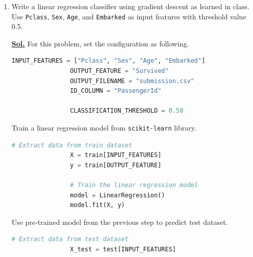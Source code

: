 \documentclass[12pt, a4paper]{article}
\newcommand{\sol}{\par\noindent\underline{\textbf{Sol.}} }
\newcommand{\ans}{\par\noindent\underline{\textbf{Ans.}} }
\begin{document}
\begin{enumerate}
\begin{itemize}
\begin{lstlisting}[language=Python, caption=Repeat the process on the \texttt{Sex} column., gobble=20]
                    # Calculate mode value of the Sex column.
                    mode_sex = train["Sex"].mode()[0]
                    print(f"The mode of sex is {mode_sex}.")

                    # Fill missing value with mode value
                    train["Sex"] = train["Sex"].fillna(mode_sex)
                \end{lstlisting}

                \ans The mode value of the \texttt{Sex} column is 0 (male).

            \end{itemize}
    \pagebreak

        \item[\textbf{T10.}] Write a linear regression classifier using gradient descent as learned in class. Use \texttt{Pclass}, \texttt{Sex}, \texttt{Age}, and \texttt{Embarked} as input features with threshold value 0.5.

            \sol For this problem, set the configuration as following.

            \begin{lstlisting}[language=Python, caption=Configuration for problem \textbf{T10}, gobble=16]
                INPUT_FEATURES = ["Pclass", "Sex", "Age", "Embarked"]
                OUTPUT_FEATURE = "Survived"
                OUTPUT_FILENAME = "submission.csv"
                ID_COLUMN = "PassengerId"

                CLASSIFICATION_THRESHOLD = 0.50
            \end{lstlisting}

            Train a linear regression model from \texttt{scikit-learn} library.

            \begin{lstlisting}[language=Python, caption=Train a linear regression model, gobble=16]
                # Extract data from train dataset
                X = train[INPUT_FEATURES]
                y = train[OUTPUT_FEATURE]

                # Train the linear regression model
                model = LinearRegression()
                model.fit(X, y)
            \end{lstlisting}

            Use pre-trained model from the previous step to predict test dataset.

            \begin{lstlisting}[language=Python, caption=Prediction on test dataset using linear regression model, gobble=16]
                # Extract data from test dataset
                X_test = test[INPUT_FEATURES]


\end{lstlisting}
\end{enumerate}
\end{document}
